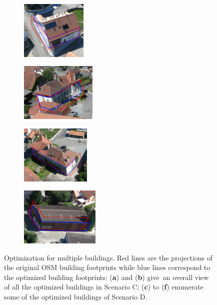 \documentclass[remotesensing,article,accept,moreauthors,pdftex,10pt,a4paper]{mdpi}
\theoremstyle{mdpi}
\newcounter{ex}
\newcounter{re}
\begin{document}
\begin{figure}[H]
\begin{subfigure}[tbp]{0.48\columnwidth}
           \caption[]{}
           {{\small }}
           \label{fig:7b}
       \end{subfigure}
       \hfill
       \begin{subfigure}[tbp]{0.24\columnwidth}
           \centering
           \includegraphics[height=2.8cm]{optimize/su_both_1.png}
           \caption[]{}
           {{\small }}
           \label{fig:7c}
       \end{subfigure}
       \hfill
       \begin{subfigure}[tbp]{0.24\columnwidth}
           \centering
           \includegraphics[height=2.8cm]{optimize/su_both_2.png}
           \caption[]{}
           {{\small }}
           \label{fig:7d}
       \end{subfigure} 
       \hfill
       \begin{subfigure}[tbp]{0.24\columnwidth}
           \centering
           \includegraphics[height=2.8cm]{optimize/su_both_3.png}
           \caption[]{}
           {{\small }}
           \label{fig:7e}
       \end{subfigure}
       \hfill
       \begin{subfigure}[tbp]{0.24\columnwidth}
           \centering
           \includegraphics[height=2.8cm]{optimize/su_both_4.png}
           \caption[]{}
           {{\small }}
           \label{fig:7f}
       \end{subfigure}         
       \caption{Optimization for multiple buildings. Red lines are the projections of the original OSM building footprints while blue lines correspond to the optimized building footprints; (\textbf{a}) and (\textbf{b}) give~an overall view of all the optimized buildings in Scenario C; (\textbf{c}) to (\textbf{f}) enumerate some of the optimized buildings of Scenario D.}
       
       \label{fig:optimized}
\end{figure}
\end{document}
